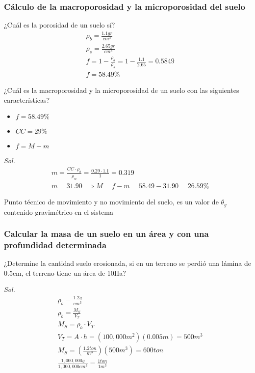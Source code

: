 \subsubsection{Cálculo de la macroporosidad y la microporosidad del suelo}
¿Cuál es la porosidad de un suelo sí?
\begin{align*}
    &\rho_b = \frac{1.1gr}{cm^3}\\ 
    &\rho_s = \frac{2.65gr}{cm^3}\\
    &f = 1 -\frac{\rho_b}{\rho_s} = 1 -\frac{1.1}{2.65} = 0.5849\\
    &f = 58.49\%
\end{align*}
\begin{example}
    ¿Cuál es la macroporosidad y la microporosidad de un suelo con las siguientes características?
    \begin{itemize}
        \item $f=58.49\%$
        \item $CC=29\%$
        \item $f=M+m$
    \end{itemize}
\end{example}
\textit{ Sol. }
\begin{align*}
    &m =\frac{CC \cdot \rho_b}{\rho_w} = \frac{0.29 \cdot 1.1}{1} = 0.319\\
    &m = 31.90\implies M = f- m = 58.49 - 31.90 = 26.59\%
\end{align*}
\begin{definition}
    Punto técnico de movimiento y no movimiento del suelo, es un valor de $\theta_g$ contenido gravimétrico en el sistema
\end{definition}
\subsubsection{Calcular la masa de un suelo en un área y con una profundidad determinada}
\begin{example}
    
¿Determine la cantidad suelo erosionada, si en un terreno se perdió una lámina de 0.5cm, el terreno tiene un área de 10Ha?
\end{example}
\textit{ Sol. }
\begin{align*}
    &\rho_b =\frac{1.2g}{cm^3}\\
    &\rho_b = \frac{M_S}{V_T}\\
    &M_S =\rho_b\cdot V_T\\
    &V_T = A\cdot h =\left(100,000m^2\right)\left(0.005m\right) = 500m^3\\
    &M_S =\left(\frac{1.2ton}{m^3}\right)\left(500m^3\right) = 600ton\\
    &\frac{1,000,000g}{1,000,000cm^3} = \frac{1ton}{1m^3}
\end{align*}
